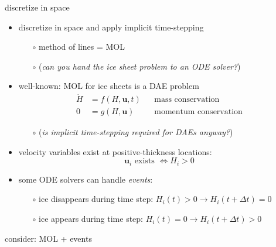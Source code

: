 \documentclass[hide notes,intlimits]{beamer}
\begin{document}
\begin{frame}{discretize in space}

\begin{itemize}
\item discretize in space and apply implicit time-stepping
    \begin{itemize}
    \item[$\circ$] method of lines = MOL
    \item[$\circ$] (\emph{can you hand the ice sheet problem to an ODE solver?})
    \end{itemize}
\item well-known: MOL for ice sheets is a DAE problem
\begin{align*}
\dot H &= f(H,\mathbf{u},t) && \text{mass conservation} \\
     0 &= g(H,\mathbf{u})   && \text{momentum conservation}
\end{align*}
\vspace{-5mm}
    \begin{itemize}
    \item[$\circ$] (\emph{is implicit time-stepping required for DAEs anyway?})
    \end{itemize}
\item velocity variables exist at positive-thickness locations:
    $$\mathbf{u}_i \text{ exists } \iff H_i > 0$$
\item some ODE solvers can handle \emph{events}:
    \begin{itemize}
    \item[$\circ$] ice disappears during time step:  $H_i(t)>0 \to H_i(t+\Delta t)=0$
    \item[$\circ$] ice appears during time step:  $H_i(t)=0 \to H_i(t+\Delta t)>0$
    \end{itemize}
\end{itemize}
\end{frame}


\begin{frame}{consider: MOL + events}

\begin{center}

\end{center}
\end{frame}
\end{document}
